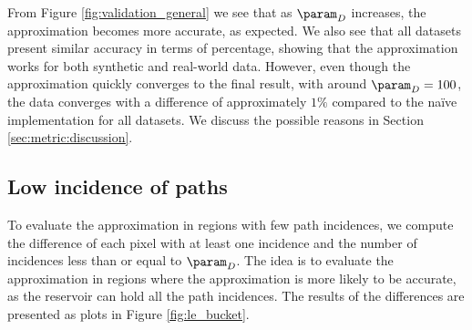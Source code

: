 From Figure \ref{fig:validation_general} we see that as $\param_D$ increases, the approximation becomes more accurate, as expected. We also see that all datasets present similar accuracy in terms of percentage, showing that the approximation works for both synthetic and real-world data. However, even though the approximation quickly converges to the final result, with around $\param_D = 100$, the data converges with a difference of approximately $1\%$ compared to the na\"ive implementation for all datasets. We discuss the possible reasons in Section \ref{sec:metric:discussion}.

\subsection{Low incidence of paths}
\label{subsec:validation_small}

To evaluate the approximation in regions with few path incidences, we compute the difference of each pixel with at least one incidence and the number of incidences less than or equal to $\param_D$. The idea is to evaluate the approximation in regions where the approximation is more likely to be accurate, as the reservoir can hold all the path incidences. The results of the differences are presented as plots in Figure \ref{fig:le_bucket}.


